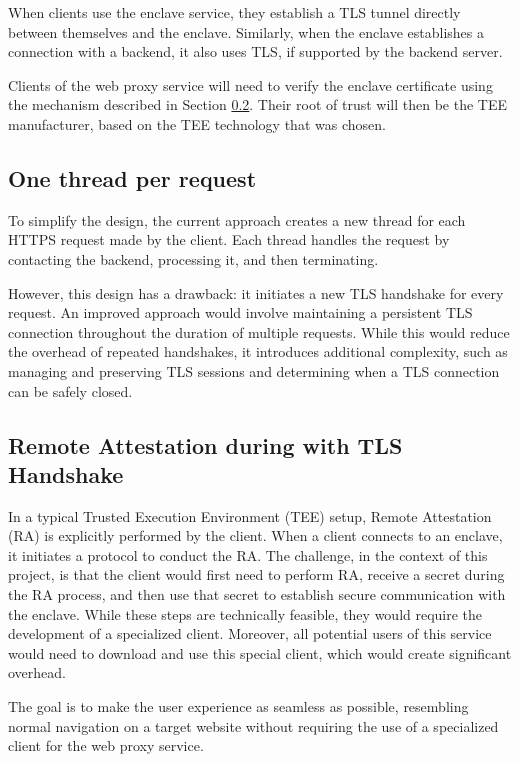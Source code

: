 When clients use the enclave service, they establish a TLS tunnel directly between themselves and the enclave. Similarly, when the enclave establishes a connection with a backend, it also uses TLS, if supported by the backend server.

Clients of the web proxy service will need to verify the enclave certificate using the mechanism described in Section \ref{sec:ra-over-tls}. Their root of trust will then be the TEE manufacturer, based on the TEE technology that was chosen.

\subsection{One thread per request}
To simplify the design, the current approach creates a new thread for each HTTPS request made by the client. Each thread handles the request by contacting the backend, processing it, and then terminating.

However, this design has a drawback: it initiates a new TLS handshake for every request. An improved approach would involve maintaining a persistent TLS connection throughout the duration of multiple requests. While this would reduce the overhead of repeated handshakes, it introduces additional complexity, such as managing and preserving TLS sessions and determining when a TLS connection can be safely closed.

\subsection{Remote Attestation during with TLS Handshake} \label{sec:ra-over-tls}
In a typical Trusted Execution Environment (TEE) setup, Remote Attestation (RA) is explicitly performed by the client. When a client connects to an enclave, it initiates a protocol to conduct the RA.
The challenge, in the context of this project, is that the client would first need to perform RA, receive a secret during the RA process, and then use that secret to establish secure communication with the enclave. While these steps are technically feasible, they would require the development of a specialized client. Moreover, all potential users of this service would need to download and use this special client, which would create significant overhead.

The goal is to make the user experience as seamless as possible, resembling normal navigation on a target website without requiring the use of a specialized client for the web proxy service.

